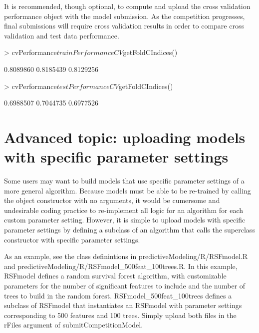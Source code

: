 \documentclass[10pt]{article}
\begin{document}
It is recommended, though optional, to compute and upload the cross validation performance object with the model submission. As the competition progresses, final submissions will require cross validation results in order to compare cross validation and test data performance.
\begin{Schunk}
\end{Schunk}

\begin{Schunk}
\begin{Sinput}
> cvPerformance$trainPerformanceCV$getFoldCIndices()
\end{Sinput}
\begin{Soutput}
[1] 0.8089860 0.8185439 0.8129256
\end{Soutput}
\begin{Sinput}
> cvPerformance$testPerformanceCV$getFoldCIndices()
\end{Sinput}
\begin{Soutput}
[1] 0.6988507 0.7044735 0.6977526
\end{Soutput}
\end{Schunk}

\section{Advanced topic: uploading models with specific parameter settings}
Some users may want to build models that use specific parameter settings of a more general algorithm. Because models must be able to be re-trained by calling the object constructor with no arguments, it would be cumersome and undesirable coding practice to re-implement all logic for an algorithm for each custom parameter setting. However, it is simple to upload models with specific parameter settings by defining a subclass of an algorithm that calls the superclass constructor with specific parameter settings.

As an example, see the class definintions in predictiveModeling/R/RSFmodel.R and predictiveModeling/R/RSFmodel\_500feat\_100trees.R. In this example, RSFmodel defines a random survival forest algorithm, with customizable parameters for the number of significant features to include and the number of trees to build in the random forest. RSFmodel\_500feat\_100trees defines a subclass of RSFmodel that instantiates an RSFmodel with parameter settings corresponding to 500 features and 100 trees. Simply upload both files in the rFiles argument of submitCompetitionModel.
\end{document}
